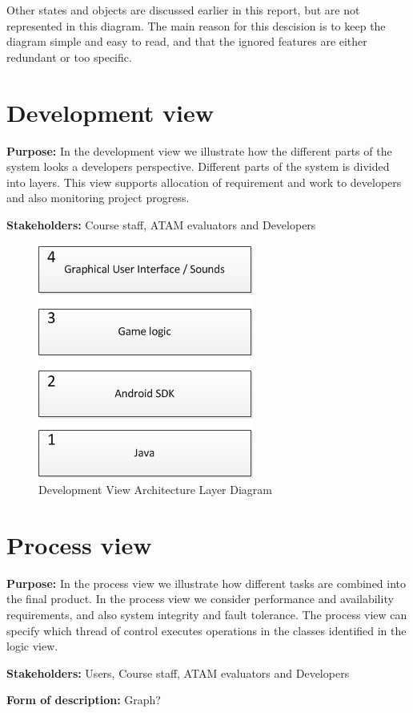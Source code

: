     Other states and objects are discussed earlier in this report, but are not represented in this diagram. The main reason for this descision is to keep the diagram simple and easy to read, and that the ignored features are either redundant or too specific.



    \section{Development view}
    \textbf{Purpose:} In the development view we illustrate how the different parts of the system looks a developers perspective. Different parts of the system is divided into layers. This view supports allocation of requirement
    and work to developers and also monitoring project progress.  
    
    \noindent\textbf{Stakeholders:} Course staff, ATAM evaluators and Developers
    

    \begin{figure}[h]
        \includegraphics{DevelopmentView.png}
        \caption{Development View Architecture Layer Diagram}
        \label{fig:DevelopmentView}
    \end{figure}
    
    
    
    \section{Process view}
    \noindent\textbf{Purpose:} In the process view we illustrate how different tasks are combined into the final product. In the process view we consider performance and availability requirements, and also system integrity and fault tolerance.
    The process view can specify which thread of control executes operations in the classes identified in the logic view. 
    
    \noindent\textbf{Stakeholders:} Users, Course staff, ATAM evaluators and Developers 
    
    \noindent\textbf{Form of description:} Graph?
